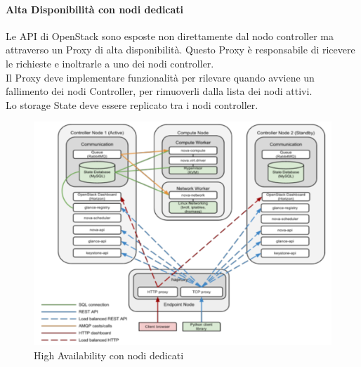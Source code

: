 \documentclass{article}
\begin{document}
\paragraph{Alta Disponibilità con nodi dedicati}
Le API di OpenStack sono esposte non direttamente dal nodo controller ma attraverso un Proxy di alta disponibilità. Questo Proxy è responsabile di ricevere le richieste e inoltrarle a uno dei nodi controller. \\
Il Proxy deve implementare funzionalità per rilevare quando avviene un fallimento dei nodi Controller, per rimuoverli dalla lista dei nodi attivi. \\ 
Lo storage State deve essere replicato tra i nodi controller.
\begin{figure}[H]
    \centering
    \includegraphics[scale=0.3]{img/high availability 2.png}
    \caption{High Availability con nodi dedicati}
\end{figure}\noindent
\end{document}
